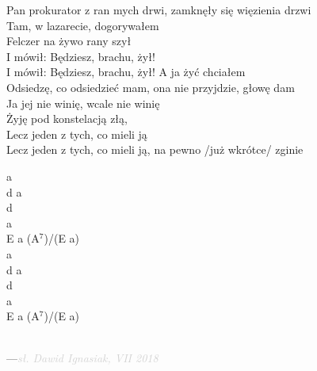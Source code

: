 \documentclass[a5paper, 10pt]{book}
\begin{document}
\newpage
\begin{minipage}[t]{0.8\textwidth}
  Pan prokurator z ran mych drwi, zamknęły się więzienia drzwi\\
  Tam, w lazarecie, dogorywałem\\
  \hspace*{5mm}Felczer na żywo rany szył\\
  \hspace*{5mm}I mówił: Będziesz, brachu, żył!\\
  \hspace*{5mm}I mówił: Będziesz, brachu, żył! A ja żyć chciałem\\

  Odsiedzę, co odsiedzieć mam, ona nie przyjdzie, głowę dam\\
  Ja jej nie winię, wcale nie winię\\
  \hspace*{5mm}Żyję pod konstelacją złą,\\
  \hspace*{5mm}Lecz jeden z tych, co mieli ją\\
  \hspace*{5mm}Lecz jeden z tych, co mieli ją, na pewno /już wkrótce/ zginie\\
\end{minipage}
\begin{minipage}[t]{0.2\textwidth}
  a\\
  d a\\
  d\\
  a\\
  E a (A$^7$)/(E a)\\

  a\\
  d a\\
  d\\
  a\\
  E a (A$^7$)/(E a)\\
\end{minipage}
\vspace*{2cm}\\
---\hfill\textcolor{lightgray}{\textit{sł. Dawid Ignasiak, VII 2018}}\\~\\
\end{document}
